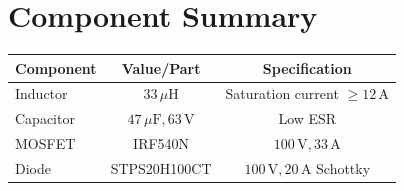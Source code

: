 \documentclass[12pt]{article}
\begin{document}
\section*{Component Summary}
\begin{center}
\begin{tabular}{lcc}
\toprule
\textbf{Component} & \textbf{Value/Part} & \textbf{Specification} \\
\midrule
Inductor & \( 33 \, \mu\text{H} \) & Saturation current \( \geq 12 \, \text{A} \) \\
Capacitor & \( 47 \, \mu\text{F}, 63 \, \text{V} \) & Low ESR \\
MOSFET & IRF540N & \( 100 \, \text{V}, 33 \, \text{A} \) \\
Diode & STPS20H100CT & \( 100 \, \text{V}, 20 \, \text{A} \) Schottky \\
\bottomrule
\end{tabular}
\end{center}
\end{document}
